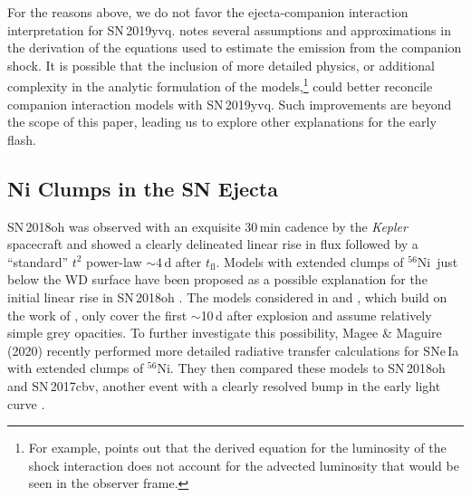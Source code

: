 \documentclass[twocolumn]{aastex63}
\newcommand{\tfl}{$t_\mathrm{fl}$}
\newcommand{\radni}{$^{56}$Ni}
\newcommand{\sn}{SN\,2019yvq}
\begin{document}
For the reasons above, we do not favor the ejecta-companion interaction
interpretation for \sn. \citet{Kasen10a} notes several assumptions and
approximations in the derivation of the equations used to estimate the
emission from the companion shock. It is possible that the inclusion of more
detailed physics, or additional complexity in the analytic formulation of the
models,\footnote{For example, \citet{Kasen10a} points out that the derived
equation for the luminosity of the shock interaction does not account for the
advected luminosity that would be seen in the observer frame.} could better
reconcile companion interaction models with \sn. Such improvements are beyond
the scope of this paper, leading us to explore other explanations for the
early flash.

\subsection{Ni Clumps in the SN Ejecta}

SN\,2018oh was observed with an exquisite 30\,min cadence by the
\textit{Kepler} spacecraft and showed a clearly delineated linear rise in
flux followed by a ``standard'' $t^2$ power-law $\sim$4\,d after \tfl. Models
with extended clumps of \radni\ just below the WD surface have been proposed
as a possible explanation for the initial linear rise in SN\,2018oh
\citep{Shappee19,Dimitriadis19}. The models considered in \citet{Shappee19}
and \citet{Dimitriadis19}, which build on the work of \citet{Piro16}, only
cover the first $\sim$10\,d after explosion and assume relatively simple grey
opacities. To further investigate this possibility, Magee \& Maguire (2020)
recently performed more detailed radiative transfer calculations for SNe\,Ia
with extended clumps of \radni. They then compared these models to SN\,2018oh
and SN\,2017cbv, another event with a clearly resolved bump in the early
light curve \citep{Hosseinzadeh17}.
\end{document}
